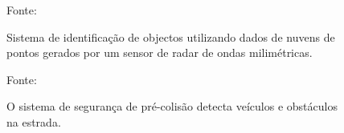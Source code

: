 \documentclass[xcolor=dvipsnames, aspectratio=169]{beamer}
\begin{document}
\begin{frame}
\begin{itemize}
            \newpage
            \begin{figure}
                \centering
                {Fonte: \cite{huang2023application}}
                \caption{Sistema de identificação de objectos utilizando dados de nuvens de pontos gerados por um sensor de radar de ondas milimétricas.}
                \label{fig:MMW_people_identification}
            \end{figure}

            \newpage
            \begin{figure}
                \centering
                {Fonte: \cite{toyota_2006}}
                \caption{O sistema de segurança de pré-colisão detecta veículos e obstáculos na estrada.}
                \label{fig:MMW_toyota_vehicle_detection}
            \end{figure}
        \end{itemize}
    \end{frame}
\end{document}
